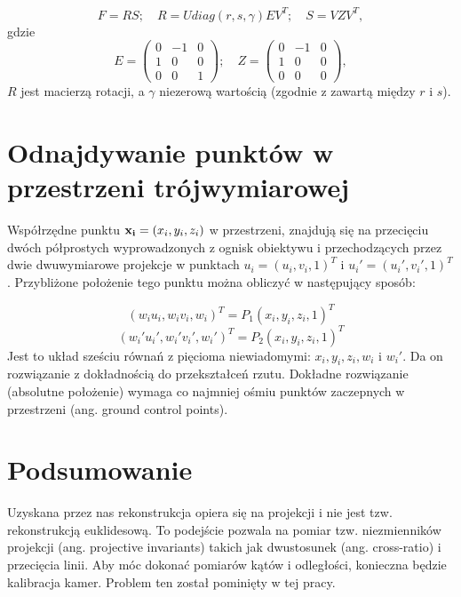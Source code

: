 \begin{equation}
  F = RS;\quad R = Udiag(r,s,\gamma)EV^T;\quad S = VZV^T ,
\end{equation}
gdzie 
\begin{equation}
  E = \begin{pmatrix} 
    0 &-1 & 0 \\
    1 & 0 & 0 \\
    0 & 0 & 1
  \end{pmatrix}
  ;\quad
  Z = \begin{pmatrix} 
    0 &-1 & 0 \\
    1 & 0 & 0 \\
    0 & 0 & 0
  \end{pmatrix},
\end{equation}
$R$ jest macierzą rotacji, a $\gamma$ niezerową wartością (zgodnie z
\cite{stereo} zawartą między $r$ i $s$).

\section{Odnajdywanie punktów w przestrzeni trójwymiarowej}

Współrzędne punktu ${\bf x_i} = (x_i, y_i, z_i) $ w przestrzeni, znajdują się
na przecięciu dwóch półprostych wyprowadzonych z ognisk obiektywu i
przechodzących przez dwie dwuwymiarowe projekcje w punktach $u_i = (u_i, v_i, 1)^T$ i
$u_i\prime = (u_i\prime, v_i\prime, 1)^T$. Przybliżone położenie tego punktu
można obliczyć w następujący sposób: 

\begin{equation} (w_i u_i, w_i v_i, w_i)^T = P_1(x_i, y_i, z_i, 1)^T
\end{equation} \begin{equation} (w_i\prime u_i\prime, w_i\prime v_i\prime,
  w_i\prime)^T = P_2(x_i, y_i, z_i, 1)^T \end{equation} Jest to układ sześciu
  równań z pięcioma niewiadomymi: $x_i, y_i, z_i, w_i$ i $w_i\prime$. Da on
  rozwiązanie z dokładnością do przekształceń rzutu.  Dokładne rozwiązanie
  (absolutne położenie) wymaga co najmniej ośmiu punktów zaczepnych w
  przestrzeni (ang. ground control points).

\section{Podsumowanie}

Uzyskana przez nas rekonstrukcja opiera się na projekcji i nie jest tzw.
rekonstrukcją euklidesową. To podejście pozwala na pomiar tzw. niezmienników
projekcji (ang. projective invariants) takich jak dwustosunek (ang.
cross-ratio) i przecięcia linii. Aby móc dokonać pomiarów kątów i odległości,
konieczna będzie kalibracja kamer. Problem ten został pominięty w tej pracy.
